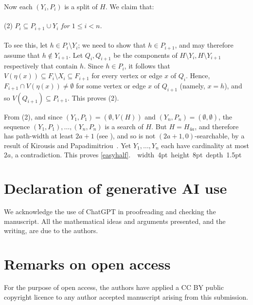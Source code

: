 \documentclass[titlepage,11pt]{article}
\newcommand\blackslug{\hbox{\hskip 1pt \vrule width 4pt height 8pt depth 1.5pt
		\hskip 1pt}}
\newcommand\bbox{\hfill \quad \blackslug \bigbreak}
\def\LL{,\ldots,}
\begin{document}
	Now each $(Y_i, P_i)$ is a split of $H$.
	We claim that:
	\\
	\\
	(2) {\em $P_i\subseteq P_{i+1}\cup Y_i$ for $1\le i<n$.}
	\\
	\\
	To see this, let $h\in P_i\setminus Y_i$; we need to show that $h\in P_{i+1}$, and may therefore assume that $h\notin Y_{i+1}$.
	Let
	$Q_i, Q_{i+1}$ be the components of $H\setminus Y_i, H\setminus Y_{i+1}$ respectively that contain $h$.
	Since $h\in P_i$, it follows that
	$V(\eta(x))\subseteq F_i\setminus X_i\subseteq F_{i+1}$ for every vertex or edge $x$ of $Q_i$. Hence,
	$F_{i+1}\cap V(\eta(x))\ne \emptyset$
	for some vertex or edge $x$ of $Q_{i+1}$ (namely, $x=h$), and so $V(Q_{i+1})\subseteq P_{i+1}$. This proves (2).
	
	\bigskip
	
	From (2), and since $(Y_1,P_1) = (\emptyset, V(H))$ and $(Y_n,P_n) = (\emptyset, \emptyset)$,
	the sequence $(Y_1,P_1)\LL (Y_n,P_n)$ is a search of $H$. But $H=H_{4a}$, and therefore has
	path-width at least $2a+1$ (see \cite{GM1}), and so is not $(2a+1,0)$-searchable, by a result of Kirousis and
	Papadimitriou~\cite{kirousis1, kirousis2}. Yet $Y_1\LL Y_n$ each have cardinality at most $2a$, a contradiction.
	This proves \ref{easyhalf}.~\bbox
	
	\section*{Declaration of generative AI use}
	We acknowledge the use of ChatGPT in proofreading and checking the manuscript. All the mathematical ideas and arguments presented, and the writing, are due to the authors.
	
	\section*{Remarks on open access}
	For the purpose of open access, the authors have applied a CC BY public copyright licence to
	any author accepted manuscript arising from this submission.
	
	
	
\end{document}
